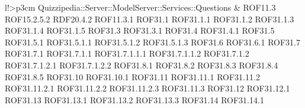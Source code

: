 \begin{tabella}{l!{\VRule}>{\centering\arraybackslash}p{3cm}}
Quizzipedia::Server::ModelServer::Services::Questions & ROF11.3 \linebreak ROF15.2.5.2 \linebreak RDF20.4.2 \linebreak ROF11.3.1 \linebreak ROF31.1 \linebreak ROF31.1.1 \linebreak ROF31.1.2 \linebreak ROF31.1.3 \linebreak ROF31.1.4 \linebreak ROF31.1.5 \linebreak ROF31.3 \linebreak ROF31.3.1 \linebreak ROF31.4 \linebreak ROF31.4.1 \linebreak ROF31.5 \linebreak ROF31.5.1 \linebreak ROF31.5.1.1 \linebreak ROF31.5.1.2 \linebreak ROF31.5.1.3 \linebreak ROF31.6 \linebreak ROF31.6.1 \linebreak ROF31.7 \linebreak ROF31.7.1 \linebreak ROF31.7.1.1 \linebreak ROF31.7.1.1.1 \linebreak ROF31.7.1.1.2 \linebreak ROF31.7.1.2 \linebreak ROF31.7.1.2.1 \linebreak ROF31.7.1.2.2 \linebreak ROF31.8.1 \linebreak ROF31.8.2 \linebreak ROF31.8.3 \linebreak ROF31.8.4 \linebreak ROF31.8.5 \linebreak ROF31.10 \linebreak ROF31.10.1 \linebreak ROF31.11 \linebreak ROF31.11.1 \linebreak ROF31.11.2 \linebreak ROF31.11.2.1 \linebreak ROF31.11.2.2 \linebreak ROF31.11.2.3 \linebreak ROF31.11.3 \linebreak ROF31.12 \linebreak ROF31.12.1 \linebreak ROF31.13 \linebreak ROF31.13.1 \linebreak ROF31.13.2 \linebreak ROF31.13.3 \linebreak ROF31.14 \linebreak ROF31.14.1 
\end{tabella}
